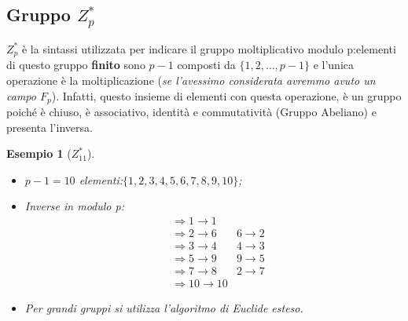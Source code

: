 \documentclass{book}
\newtheorem{esempio}{\textcolor{Grey1}{Esempio}}
\begin{document}
\subsection{Gruppo \(Z_{p}^{*}\)}
\(Z_{p}^{*}\) è la sintassi utilizzata per indicare il gruppo moltiplicativo modulo p:\@gli elementi di questo gruppo \textbf{finito} sono \(p-1\) composti da \( \{ 1,2,\ldots,p-1\} \) e l'unica operazione è la moltiplicazione (\emph{se l'avessimo considerata avremmo avuto un campo \(F_{p}\)})\@.\newline
Infatti, questo insieme di elementi con questa operazione, è un gruppo poiché è chiuso, è associativo, identità e commutatività (Gruppo Abeliano) e presenta l'inversa\@.
\begin{esempio}[\(Z_{11}^{*}\)]
	\begin{itemize}
		\item \(p-1=10\) elementi:\( \{1,2,3,4,5,6,7,8,9,10 \} \);
		\item Inverse in modulo p:\begin{align*}
			       & \Rightarrow 1\rightarrow 1                        \\
			       & \Rightarrow 2\rightarrow 6\quad & 6 \rightarrow 2 \\
			       & \Rightarrow 3\rightarrow 4\quad & 4 \rightarrow 3 \\
			       & \Rightarrow 5\rightarrow 9\quad & 9 \rightarrow 5 \\
			       & \Rightarrow 7\rightarrow 8\quad & 2 \rightarrow 7 \\
			       & \Rightarrow 10\rightarrow 10
		      \end{align*}
		\item Per grandi gruppi si utilizza l'algoritmo di Euclide esteso.
	\end{itemize}
\end{esempio}
\end{document}
